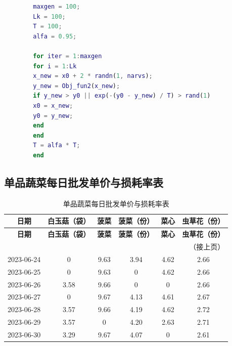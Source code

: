\documentclass[a4paper,12pt]{article}
\begin{document}
	\begin{lstlisting}[language=Matlab, basicstyle=\small\ttfamily]
		% Simulated Annealing
		maxgen = 100;
		Lk = 100;
		T = 100;
		alfa = 0.95;
		
		for iter = 1:maxgen
		for i = 1:Lk
		x_new = x0 + 2 * randn(1, narvs);
		y_new = Obj_fun2(x_new);
		if y_new > y0 || exp(-(y0 - y_new) / T) > rand(1)
		x0 = x_new;
		y0 = y_new;
		end
		end
		T = alfa * T;
		end
	\end{lstlisting}
	
	\subsection{单品蔬菜每日批发单价与损耗率表}
	
	\begin{longtable}{c|c|c|c|c|c}
		\caption{单品蔬菜每日批发单价与损耗率表} \\
		\hline
		\textbf{日期} & \textbf{白玉菇（袋）} & \textbf{菠菜} & \textbf{菠菜（份）} & \textbf{菜心} & \textbf{虫草花（份）} \\
		\hline
		\endfirsthead
		\hline
		\textbf{日期} & \textbf{白玉菇（袋）} & \textbf{菠菜} & \textbf{菠菜（份）} & \textbf{菜心} & \textbf{虫草花（份）} \\
		\hline
		\endhead
		\hline
		\multicolumn{6}{r}{（接上页）} \\
		\endfoot
		\hline
		\endlastfoot
		
		2023-06-24 & 0 & 9.63 & 3.94 & 4.62 & 2.66 \\
		2023-06-25 & 0 & 9.63 & 0 & 4.62 & 2.66 \\
		2023-06-26 & 3.58 & 9.66 & 0 & 0 & 2.66 \\
		2023-06-27 & 0 & 9.67 & 4.13 & 4.61 & 2.67 \\
		2023-06-28 & 3.57 & 9.66 & 4.19 & 4.62 & 2.72 \\
		2023-06-29 & 3.57 & 0 & 4.20 & 2.63 & 2.71 \\
		2023-06-30 & 3.29 & 9.67 & 4.07 & 0 & 2.61 \\
		
	\end{longtable}
	
\end{document}
